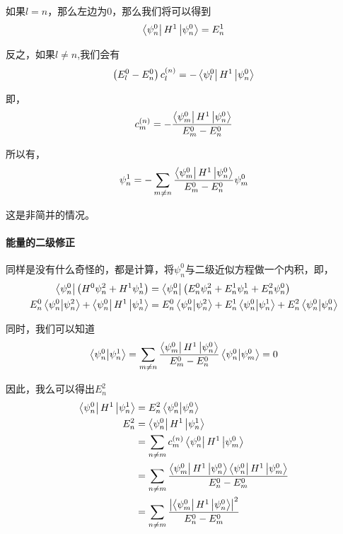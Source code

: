 \documentclass{article}
\begin{document}
如果$l=n$，那么左边为$0$，那么我们将可以得到
\begin{equation*}
    \bra{\psi_n^0}H^1\ket{\psi_n^0}=E_n^1
\end{equation*}

反之，如果$l\neq n$,我们会有
\begin{align*}
    \left(E_l^0-E_n^0\right)c_l^{(n)}=-\bra{\psi_l^0}H^1\ket{\psi_n^0}
\end{align*}

即，
\begin{align*}
    c_m^{(n)}=-\dfrac{\bra{\psi_m^0}H^1\ket{\psi_n^0}}{E_m^0-E_n^0}
\end{align*}

所以有，
\begin{align*}
    \psi_n^1=-\sum_{m\neq n}\dfrac{\bra{\psi_m^0}H^1\ket{\psi_n^0}}{E_m^0-E_n^0}\psi_m^0
\end{align*}

这是非简并的情况。

\paragraph{能量的二级修正}
同样是没有什么奇怪的，都是计算，将$\psi_n^0$与二级近似方程做一个内积，即，
\begin{align*}
    \bra{\psi_n^0}\left(H^0\psi_n^2+H^1\psi_n^1\right)&=\bra{\psi_n^0}\left(E_n^0\psi_n^2+E_n^1\psi_n^1+E_n^2\psi_n^0\right)\\
    E_n^0\braket{\psi_n^0}{\psi_n^2}+\bra{\psi_n^0}H^1\ket{\psi_n^1}&=E_n^0\braket{\psi_n^0}{\psi_n^2}+E_n^1\braket{\psi_n^0}{\psi_n^1}+E_n^2\braket{\psi_n^0}{\psi_n^0}
\end{align*}

同时，我们可以知道
\begin{align*}
    \braket{\psi_n^0}{\psi_n^1}=\sum_{m\neq n}\dfrac{\bra{\psi_m^0}H^1\ket{\psi_n^0}}{E_m^0-E_n^0}\braket{\psi_n^0}{\psi_m^0}=0
\end{align*}

因此，我么可以得出$E_n^2$
\begin{align*}
    \bra{\psi_n^0}H^1\ket{\psi_n^1}&=E_n^2\braket{\psi_n^0}{\psi_n^0}\\
    E_n^2&=\bra{\psi_n^0}H^1\ket{\psi_n^1}\\
    &=\sum_{n\neq m}c_m^{(n)}\bra{\psi_n^0}H^1\ket{\psi_m^0}\\
    &=\sum_{n\neq m}\dfrac{\bra{\psi_m^0}H^1\ket{\psi_n^0}\bra{\psi_n^0}H^1\ket{\psi_m^0}}{E_n^0-E_m^0}\\
    &=\sum_{n\neq m}\dfrac{\left|\bra{\psi_m^0}H^1\ket{\psi_n^0}\right|^2}{E_n^0-E_m^0}
\end{align*}
\end{document}
